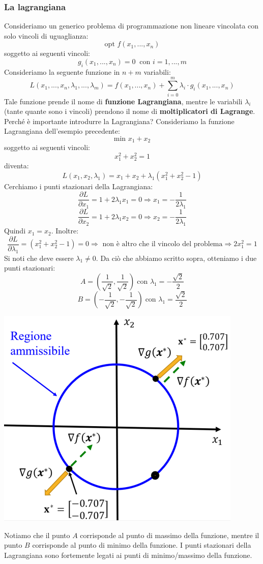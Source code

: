 \documentclass[12pt]{article}
\begin{document}
\subsubsection{La lagrangiana}
Consideriamo un generico problema di programmazione non lineare vincolata con solo vincoli di uguaglianza:
$$\textrm{opt } f(x_1,...,x_n)$$
soggetto ai seguenti vincoli:
$$g_i(x_1,...,x_n) = 0 \; \; \textrm{con } i = 1,...,m$$
Consideriamo la seguente funzione in $n+m$ variabili:
$$L(x_1,...,x_n, \lambda_1,...,\lambda_m) = f(x_1,...,x_n) + \sum_{i=0}^{m} \lambda_i \cdot g_i(x_1,...,x_n)$$
Tale funzione prende il nome di \textbf{funzione Lagrangiana}, mentre le variabili $\lambda_i$ (tante quante sono i vincoli) prendono il nome di \textbf{moltiplicatori di Lagrange}.
Perché è importante introdurre la Lagrangiana? Consideriamo la funzione Lagrangiana dell'esempio precedente:
$$\textrm{min } x_1 + x_2$$
soggetto ai seguenti vincoli:
$$x_1^2+x_2^2 = 1$$
diventa:
$$L(x_1,x_2,\lambda_1) = x_1 + x_2 + \lambda_1(x_1^2+x_2^2 - 1)$$
Cerchiamo i punti stazionari della Lagrangiana:
$$\frac{\partial L}{\partial x_1} = 1 + 2\lambda_1x_1 = 0 \Rightarrow x_1 = -\frac{1}{2\lambda_1}$$
$$\frac{\partial L}{\partial x_2} = 1 + 2\lambda_1x_2 = 0 \Rightarrow x_2 = -\frac{1}{2\lambda_1}$$
Quindi $x_1 = x_2$. Inoltre:
$$\frac{\partial L}{\partial \lambda_1} = (x_1^2 + x_2^2 - 1) = 0 \Rightarrow \textrm{ non è altro che il vincolo del problema} \Rightarrow 2x_1^2 = 1$$
Si noti che deve essere $\lambda_1 \neq 0$.
Da ciò che abbiamo scritto sopra, otteniamo i due punti stazionari:
$$A = (\frac{1}{\sqrt{2}}, \frac{1}{\sqrt{2}}) \; \textrm{con } \lambda_1 = -\frac{\sqrt{2}}{2}$$
$$B = (-\frac{1}{\sqrt{2}}, -\frac{1}{\sqrt{2}}) \; \textrm{con } \lambda_1 = \frac{\sqrt{2}}{2}$$
\begin{center}
    \includegraphics[width = 0.50\linewidth]{Images/107.PNG}
\end{center}
Notiamo che il punto $A$ corrisponde al punto di massimo della funzione, mentre il punto $B$ corrisponde al punto di minimo della funzione.
I punti stazionari della Lagrangiana sono fortemente legati ai punti di minimo/massimo della funzione.
\end{document}
